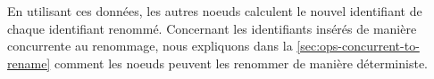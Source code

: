 En utilisant ces données, les autres noeuds calculent le nouvel identifiant de chaque identifiant renommé.
Concernant les identifiants insérés de manière concurrente au renommage, nous expliquons dans la \autoref{sec:ops-concurrent-to-rename} comment les noeuds peuvent les renommer de manière déterministe.
